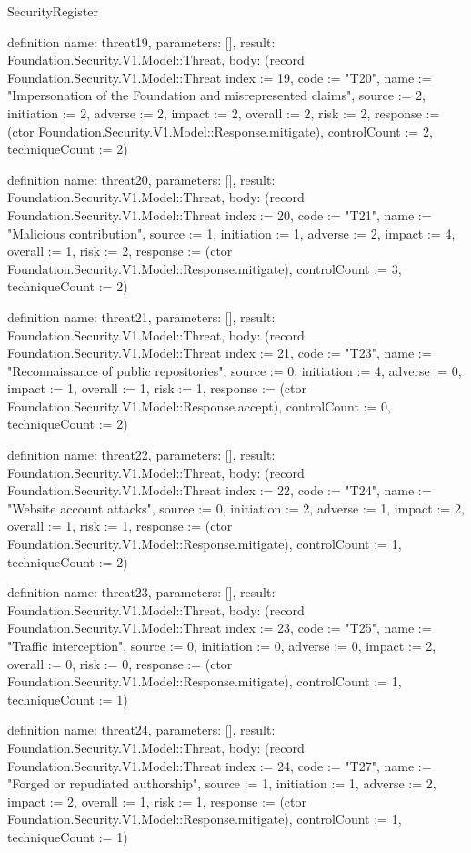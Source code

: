 \begin{lexlean}{SecurityRegister}
\begin{semanticmodule}
definition{
  name: threat19,
  parameters: [],
  result: Foundation.Security.V1.Model::Threat,
  body: (record Foundation.Security.V1.Model::Threat {index := 19, code := "T20", name := "Impersonation of the Foundation and misrepresented claims", source := 2, initiation := 2, adverse := 2, impact := 2, overall := 2, risk := 2, response := (ctor Foundation.Security.V1.Model::Response.mitigate), controlCount := 2, techniqueCount := 2})
}

definition{
  name: threat20,
  parameters: [],
  result: Foundation.Security.V1.Model::Threat,
  body: (record Foundation.Security.V1.Model::Threat {index := 20, code := "T21", name := "Malicious contribution", source := 1, initiation := 1, adverse := 2, impact := 4, overall := 1, risk := 2, response := (ctor Foundation.Security.V1.Model::Response.mitigate), controlCount := 3, techniqueCount := 2})
}

definition{
  name: threat21,
  parameters: [],
  result: Foundation.Security.V1.Model::Threat,
  body: (record Foundation.Security.V1.Model::Threat {index := 21, code := "T23", name := "Reconnaissance of public repositories", source := 0, initiation := 4, adverse := 0, impact := 1, overall := 1, risk := 1, response := (ctor Foundation.Security.V1.Model::Response.accept), controlCount := 0, techniqueCount := 2})
}

definition{
  name: threat22,
  parameters: [],
  result: Foundation.Security.V1.Model::Threat,
  body: (record Foundation.Security.V1.Model::Threat {index := 22, code := "T24", name := "Website account attacks", source := 0, initiation := 2, adverse := 1, impact := 2, overall := 1, risk := 1, response := (ctor Foundation.Security.V1.Model::Response.mitigate), controlCount := 1, techniqueCount := 2})
}

definition{
  name: threat23,
  parameters: [],
  result: Foundation.Security.V1.Model::Threat,
  body: (record Foundation.Security.V1.Model::Threat {index := 23, code := "T25", name := "Traffic interception", source := 0, initiation := 0, adverse := 0, impact := 2, overall := 0, risk := 0, response := (ctor Foundation.Security.V1.Model::Response.mitigate), controlCount := 1, techniqueCount := 1})
}

definition{
  name: threat24,
  parameters: [],
  result: Foundation.Security.V1.Model::Threat,
  body: (record Foundation.Security.V1.Model::Threat {index := 24, code := "T27", name := "Forged or repudiated authorship", source := 1, initiation := 1, adverse := 2, impact := 2, overall := 1, risk := 1, response := (ctor Foundation.Security.V1.Model::Response.mitigate), controlCount := 1, techniqueCount := 1})
}


\end{semanticmodule}
\end{lexlean}
